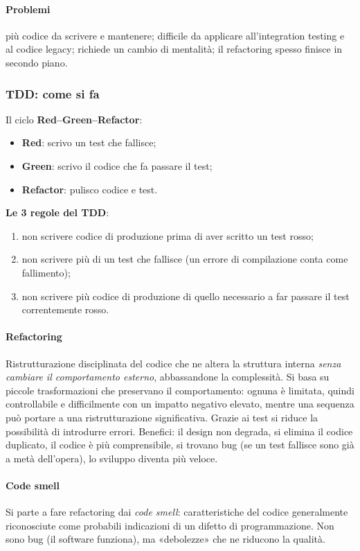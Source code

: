 \documentclass[a4paper,12pt]{article}
\begin{document}
\paragraph{Problemi} più codice da scrivere e mantenere; difficile da applicare
all'integration testing e al codice legacy; richiede un cambio di mentalità; il
refactoring spesso finisce in secondo piano.

\subsubsection{TDD: come si fa}
Il ciclo \textbf{Red--Green--Refactor}:
\begin{itemize}[nosep]
  \item \textbf{Red}: scrivo un test che fallisce;
  \item \textbf{Green}: scrivo il codice che fa passare il test;
  \item \textbf{Refactor}: pulisco codice e test.
\end{itemize}
\textbf{Le 3 regole del TDD}:
\begin{enumerate}[nosep]
  \item non scrivere codice di produzione prima di aver scritto un test rosso;
  \item non scrivere più di un test che fallisce (un errore di compilazione conta come
        fallimento);
  \item non scrivere più codice di produzione di quello necessario a far passare il test
        correntemente rosso.
\end{enumerate}

\paragraph{Refactoring} Ristrutturazione disciplinata del codice che ne altera la
struttura interna \emph{senza cambiare il comportamento esterno}, abbassandone la
complessità. Si basa su piccole trasformazioni che preservano il comportamento: ognuna è
limitata, quindi controllabile e difficilmente con un impatto negativo elevato, mentre una
sequenza può portare a una ristrutturazione significativa. Grazie ai test si riduce la
possibilità di introdurre errori. Benefici: il design non degrada, si elimina il codice
duplicato, il codice è più comprensibile, si trovano bug (se un test fallisce sono già a
metà dell'opera), lo sviluppo diventa più veloce.

\paragraph{Code smell} Si parte a fare refactoring dai \emph{code smell}: caratteristiche
del codice generalmente riconosciute come probabili indicazioni di un difetto di
programmazione. Non sono bug (il software funziona), ma «debolezze» che ne riducono la
qualità.
\end{document}
